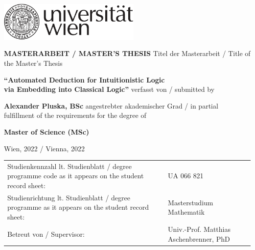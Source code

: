 \documentclass[a4paper,11pt]{report}
\theoremstyle{definition}
\theoremstyle{definition}
\theoremstyle{definition}
\theoremstyle{definition}
\theoremstyle{definition}
\theoremstyle{definition}
\theoremstyle{definition}
\begin{document}
	
	
	\begin{flushright}
		\includegraphics[width=7cm]{RZ_Logo_Uni_sw}
	\end{flushright}	
	\vskip20mm
	\begin{center}
		\huge\textbf{MASTERARBEIT / MASTER'S THESIS}
		\vskip15mm
		\normalsize{Titel der Masterarbeit / Title of the Master's Thesis}
		
		\LARGE\textbf{``Automated Deduction for Intuitionistic Logic\\via Embedding into Classical Logic''} %
		\vskip15mm
		\normalsize{verfasst von / submitted by}
		
		\Large\textbf{Alexander Pluska, BSc} %
		\vskip15mm
		\normalsize{angestrebter akademischer Grad / in partial fulfillment of the requirements for the degree of}
		
		\Large\textbf{Master of Science (MSc)}
		
		\small
	\end{center}
	\vskip15mm
	\begingroup
	\renewcommand{\arraystretch}{1.2}
	\begin{flushleft}
		Wien, 2022 / Vienna, 2022 %
		\vfill
		\addtolength{\tabcolsep}{-6pt} 
		\begin{table}[h!]
			\begingroup
			\renewcommand*{\arraystretch}{1.2}
			\renewcommand\baselinestretch{1}
			\small
			\begin{tabular}{p{7cm} p{10cm}}
				Studienkennzahl lt. Studienblatt / \newline degree programme code as it appears on \newline the student record sheet: &UA 066 821 \\
				Studienrichtung lt. Studienblatt / \newline degree programme as it appears on \newline the student record sheet:& Masterstudium Mathematik\\
				Betreut von / Supervisor: & Univ.-Prof. Matthias Aschenbrenner, PhD
			\end{tabular}
			\endgroup
		\end{table}
		\addtolength{\tabcolsep}{6pt} 
	\end{flushleft}	
	\endgroup	
	\restoregeometry
	
\end{document}
